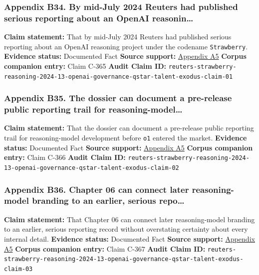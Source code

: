 \documentclass[
  american,
  11pt,
  letterpaper,
]{article}
\begin{document}
\subsubsection{Appendix B34. By mid-July 2024 Reuters had published
serious reporting about an OpenAI
reasonin\ldots{}}\label{ch-06-appendix-b34-by-mid-july-2024-reuters-had-published-serious-reporting-about-an-openai-reasonin}

\textbf{Claim statement:} That by mid-July 2024 Reuters had published
serious reporting about an OpenAI reasoning project under the codename
\texttt{Strawberry}. \textbf{Evidence status:} Documented Fact
\textbf{Source support:}
\hyperref[ch-06-appendix-a5-exclusive-openai-working-on-new-reasoning-technology-under-code-name-strawberry]{Appendix
A5} \textbf{Corpus companion entry:} Claim C-365 \textbf{Audit Claim
ID:}
\texttt{reuters-strawberry-reasoning-2024-13-openai-governance-qstar-talent-exodus-claim-01}

\subsubsection{Appendix B35. The dossier can document a pre-release
public reporting trail for
reasoning-model\ldots{}}\label{ch-06-appendix-b35-the-dossier-can-document-a-pre-release-public-reporting-trail-for-reasoning-model}

\textbf{Claim statement:} That the dossier can document a pre-release
public reporting trail for reasoning-model development before
\texttt{o1} entered the market. \textbf{Evidence status:} Documented
Fact \textbf{Source support:}
\hyperref[ch-06-appendix-a5-exclusive-openai-working-on-new-reasoning-technology-under-code-name-strawberry]{Appendix
A5} \textbf{Corpus companion entry:} Claim C-366 \textbf{Audit Claim
ID:}
\texttt{reuters-strawberry-reasoning-2024-13-openai-governance-qstar-talent-exodus-claim-02}

\subsubsection{Appendix B36. Chapter 06 can connect later
reasoning-model branding to an earlier, serious
repo\ldots{}}\label{ch-06-appendix-b36-chapter-06-can-connect-later-reasoning-model-branding-to-an-earlier-serious-repo}

\textbf{Claim statement:} That Chapter 06 can connect later
reasoning-model branding to an earlier, serious reporting record without
overstating certainty about every internal detail. \textbf{Evidence
status:} Documented Fact \textbf{Source support:}
\hyperref[ch-06-appendix-a5-exclusive-openai-working-on-new-reasoning-technology-under-code-name-strawberry]{Appendix
A5} \textbf{Corpus companion entry:} Claim C-367 \textbf{Audit Claim
ID:}
\texttt{reuters-strawberry-reasoning-2024-13-openai-governance-qstar-talent-exodus-claim-03}
\end{document}
